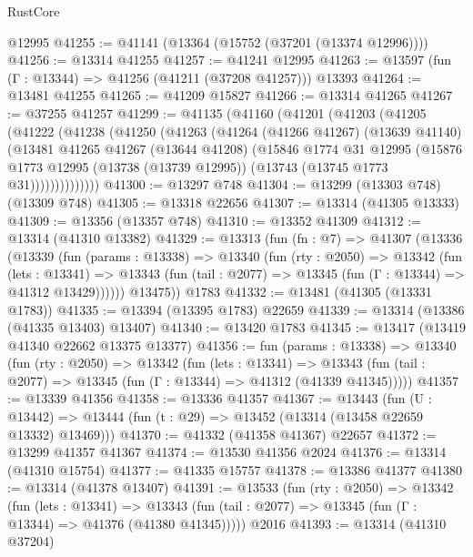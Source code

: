\begin{lexlean}{RustCore}
\begin{coremodule}
    @12995
@41255 := @41141 (@13364 (@15752 (@37201 (@13374 @12996))))
@41256 := @13314 @41255
@41257 := @41241 @12995
@41263 := @13597 (fun (Γ : @13344) => @41256 (@41211 (@37208 @41257))) @13393
@41264 := @13481 @41255
@41265 := @41209 @15827
@41266 := @13314 @41265
@41267 := @37255 @41257
@41299 := @41135
    (@41160
      (@41201
        (@41203
          (@41205
            (@41222
              (@41238
                (@41250
                  (@41263
                    (@41264
                      (@41266 @41267)
                      (@13639 @41140)
                      (@13481
                        @41265
                        @41267
                        (@13644 @41208)
                        (@15846
                          @1774
                          @31
                          @12995
                          (@15876
                            @1773
                            @12995
                            (@13738 (@13739 @12995))
                            (@13743 (@13745 @1773 @31))))))))))))))
@41300 := @13297 @748
@41304 := @13299 (@13303 @748) (@13309 @748)
@41305 := @13318 @22656
@41307 := @13314 (@41305 @13333)
@41309 := @13356 (@13357 @748)
@41310 := @13352 @41309
@41312 := @13314 (@41310 @13382)
@41329 := @13313
    (fun (fn : @7) =>
    @41307
      (@13336
        (@13339
          (fun (params : @13338) =>
          @13340
            (fun (rty : @2050) =>
            @13342
              (fun (lets : @13341) =>
              @13343 (fun (tail : @2077) => @13345 (fun (Γ : @13344) => @41312 @13429))))))
        @13475))
    @1783
@41332 := @13481 (@41305 (@13331 @1783))
@41335 := @13394 (@13395 @1783) @22659
@41339 := @13314 (@13386 (@41335 @13403) @13407)
@41340 := @13420 @1783
@41345 := @13417 (@13419 @41340 @22662 @13375 @13377)
@41356 := fun (params : @13338) =>
  @13340
    (fun (rty : @2050) =>
    @13342
      (fun (lets : @13341) =>
      @13343 (fun (tail : @2077) => @13345 (fun (Γ : @13344) => @41312 (@41339 @41345)))))
@41357 := @13339 @41356
@41358 := @13336 @41357
@41367 := @13443
    (fun (U : @13442) => @13444 (fun (t : @29) => @13452 (@13314 (@13458 @22659 @13332) @13469)))
@41370 := @41332 (@41358 @41367) @22657
@41372 := @13299 @41357 @41367
@41374 := @13530 @41356 @2024
@41376 := @13314 (@41310 @15754)
@41377 := @41335 @15757
@41378 := @13386 @41377
@41380 := @13314 (@41378 @13407)
@41391 := @13533
    (fun (rty : @2050) =>
    @13342
      (fun (lets : @13341) =>
      @13343 (fun (tail : @2077) => @13345 (fun (Γ : @13344) => @41376 (@41380 @41345)))))
    @2016
@41393 := @13314 (@41310 @37204)

\end{coremodule}
\end{lexlean}
